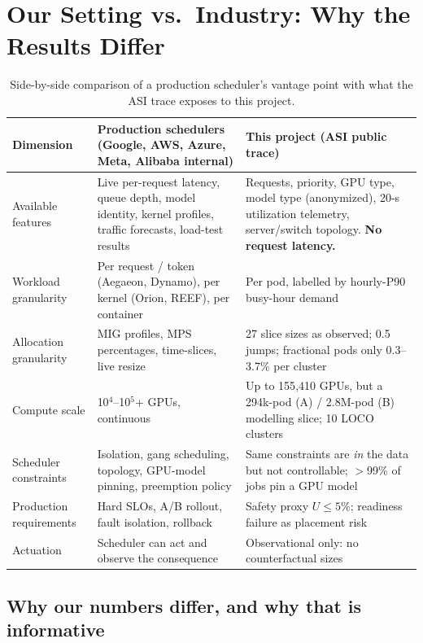 \section{Our Setting vs.\ Industry: Why the Results Differ}
\label{sec:comparison}

\begin{table}[h]
\centering\small
\caption{Side-by-side comparison of a production scheduler's vantage point with what the ASI trace exposes to this project.}
\label{tab:compare}
\begin{tabularx}{\linewidth}{@{}P{2.6cm}LL@{}}
\toprule
Dimension & Production schedulers (Google, AWS, Azure, Meta, Alibaba internal) & This project (ASI public trace) \\
\midrule
Available features & Live per-request latency, queue depth, model identity, kernel profiles, traffic forecasts, load-test results & Requests, priority, GPU type, model type (anonymized), 20-s utilization telemetry, server/switch topology. \textbf{No request latency.} \\
Workload granularity & Per request / token (Aegaeon, Dynamo), per kernel (Orion, REEF), per container & Per pod, labelled by hourly-P90 busy-hour demand \\
Allocation granularity & MIG profiles, MPS percentages, time-slices, live resize & 27 slice sizes as observed; 0.5 jumps; fractional pods only 0.3--3.7\% per cluster \\
Compute scale & 10$^4$--10$^5$+ GPUs, continuous & Up to 155{,}410 GPUs, but a 294k-pod (A) / 2.8M-pod (B) modelling slice; 10 LOCO clusters \\
Scheduler constraints & Isolation, gang scheduling, topology, GPU-model pinning, preemption policy & Same constraints are \emph{in} the data but not controllable; $>$99\% of jobs pin a GPU model \\
Production requirements & Hard SLOs, A/B rollout, fault isolation, rollback & Safety proxy $U \le 5\%$; readiness failure as placement risk \\
Actuation & Scheduler can act and observe the consequence & Observational only: no counterfactual sizes \\
\bottomrule
\end{tabularx}
\end{table}

\subsection{Why our numbers differ, and why that is informative}

